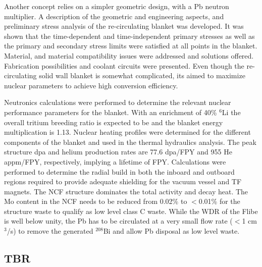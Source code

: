 Another concept relies on a simpler geometric design, with a \gls{Pb} neutron
multiplier.  A description of the geometric and engineering aspects, and
preliminary stress analysis of the re-circulating blanket was developed. It
was shown that the time-dependent and time-independent primary stresses as
well as the primary and secondary stress limits were satisfied at all points
in the blanket. Material, and material compatibility issues were addressed and
solutions offered. Fabrication possibilities and coolant circuits were
presented. Even though the re-circulating solid wall blanket is somewhat
complicated, its aimed to maximize nuclear parameters to achieve high
conversion efficiency.

Neutronics calculations were performed to determine the relevant nuclear
performance parameters for the blanket. With an enrichment of 40\% $^6$Li the
overall tritium breeding ratio is expected to be  and the
blanket energy multiplication is 1.13. Nuclear heating profiles were
determined for the different components of the blanket and used in the thermal
hydraulics analysis. The peak structure dpa and helium production rates are
77.6 dpa/FPY and 955 He appm/FPY, respectively, implying a lifetime of
 FPY. Calculations were performed to determine the radial build
in both the inboard and outboard regions required to provide adequate
shielding for the vacuum vessel and \gls{TF} magnets. The \gls{NCF} structure
dominates the total activity and decay heat. The Mo content in the \gls{NCF}
needs to be reduced from 0.02\% to $<$0.01\% for the structure waste to
qualify as low level class C waste.  While the \gls{WDR} of the Flibe is well
below unity, the \gls{Pb} has to be circulated at a very small flow rate ($<$1
cm$^3$/s) to remove the generated $^{208}$Bi and allow \gls{Pb} disposal as
low level waste.


\subsection{\acrfull{TBR}}

